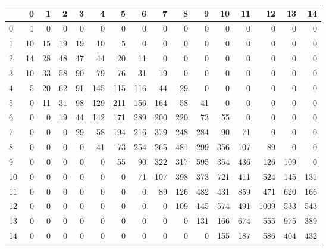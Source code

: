 \begin{tabular}{lrrrrrrrrrrrrrrr}
\toprule
{} & 0  & 1  & 2  & 3  &  4  &  5  &  6  &  7  &  8  &  9  &  10 &  11 &   12 &  13 &  14 \\
\midrule
0  &  1 &  0 &  0 &  0 &   0 &   0 &   0 &   0 &   0 &   0 &   0 &   0 &    0 &   0 &   0 \\
1  & 10 & 15 & 19 & 19 &  10 &   5 &   0 &   0 &   0 &   0 &   0 &   0 &    0 &   0 &   0 \\
2  & 14 & 28 & 48 & 47 &  44 &  20 &  11 &   0 &   0 &   0 &   0 &   0 &    0 &   0 &   0 \\
3  & 10 & 33 & 58 & 90 &  79 &  76 &  31 &  19 &   0 &   0 &   0 &   0 &    0 &   0 &   0 \\
4  &  5 & 20 & 62 & 91 & 145 & 115 & 116 &  44 &  29 &   0 &   0 &   0 &    0 &   0 &   0 \\
5  &  0 & 11 & 31 & 98 & 129 & 211 & 156 & 164 &  58 &  41 &   0 &   0 &    0 &   0 &   0 \\
6  &  0 &  0 & 19 & 44 & 142 & 171 & 289 & 200 & 220 &  73 &  55 &   0 &    0 &   0 &   0 \\
7  &  0 &  0 &  0 & 29 &  58 & 194 & 216 & 379 & 248 & 284 &  90 &  71 &    0 &   0 &   0 \\
8  &  0 &  0 &  0 &  0 &  41 &  73 & 254 & 265 & 481 & 299 & 356 & 107 &   89 &   0 &   0 \\
9  &  0 &  0 &  0 &  0 &   0 &  55 &  90 & 322 & 317 & 595 & 354 & 436 &  126 & 109 &   0 \\
10 &  0 &  0 &  0 &  0 &   0 &   0 &  71 & 107 & 398 & 373 & 721 & 411 &  524 & 145 & 131 \\
11 &  0 &  0 &  0 &  0 &   0 &   0 &   0 &  89 & 126 & 482 & 431 & 859 &  471 & 620 & 166 \\
12 &  0 &  0 &  0 &  0 &   0 &   0 &   0 &   0 & 109 & 145 & 574 & 491 & 1009 & 533 & 543 \\
13 &  0 &  0 &  0 &  0 &   0 &   0 &   0 &   0 &   0 & 131 & 166 & 674 &  555 & 975 & 389 \\
14 &  0 &  0 &  0 &  0 &   0 &   0 &   0 &   0 &   0 &   0 & 155 & 187 &  586 & 404 & 432 \\
\bottomrule
\end{tabular}
